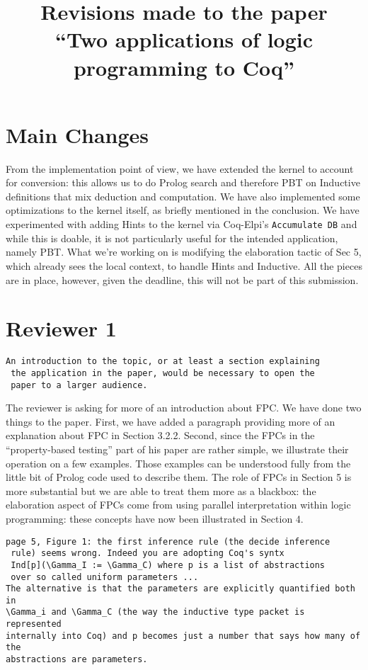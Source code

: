 \documentclass{article}
\begin{document}
\title{Revisions made to the paper \\
  ``Two applications of logic programming to Coq''}
\maketitle{}

\section*{Main Changes}

From the implementation point of view, we have extended the kernel to
account for conversion: this allows us to do Prolog search and
therefore PBT on Inductive definitions that mix deduction and
computation. We have also implemented some optimizations to the kernel
itself, as briefly mentioned in the conclusion. We have experimented
with adding Hints to the kernel via Coq-Elpi's \texttt{Accumulate DB}
and while this is doable, it is not particularly useful for the
intended application, namely PBT. What we're working on is modifying
the elaboration tactic of Sec 5, which already sees the local context,
to handle Hints and Inductive. All the pieces are in place, however,  given the deadline, this
will not be part of this submission.

\section*{Reviewer 1}
\begin{verbatim}
An introduction to the topic, or at least a section explaining
 the application in the paper, would be necessary to open the
 paper to a larger audience.
\end{verbatim}

The reviewer is asking for more of an introduction about FPC.  We
have done two things to the paper.  First, we have added a
paragraph providing more of an explanation about FPC in Section
3.2.2.  Second, since the FPCs in the ``property-based testing''
part of his paper are rather simple, we illustrate their
operation on a few examples.  Those examples can be understood
fully from the little bit of Prolog code used to describe them.
The role of FPCs in Section 5 is more substantial but we are able
to treat them more as a blackbox: the elaboration aspect of FPCs
come from using parallel interpretation within logic programming:
these concepts have now been illustrated in Section 4.

\begin{verbatim}
page 5, Figure 1: the first inference rule (the decide inference
 rule) seems wrong. Indeed you are adopting Coq's syntx
 Ind[p](\Gamma_I := \Gamma_C) where p is a list of abstractions
 over so called uniform parameters ...
The alternative is that the parameters are explicitly quantified both in
\Gamma_i and \Gamma_C (the way the inductive type packet is represented
internally into Coq) and p becomes just a number that says how many of the
abstractions are parameters.
\end{verbatim}
\end{document}
